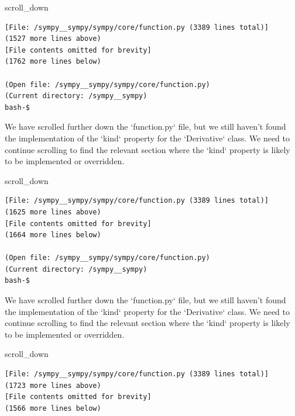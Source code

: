 {\begin{agentbox}
\hrulefill
\begin{CodeVerbatim}[breaklines=true, breakanywhere=true]
scroll_down
\end{CodeVerbatim}
\end{agentbox}
\begin{observationbox}\begin{Verbatim}[breaklines=true, breakanywhere=true]
[File: /sympy__sympy/sympy/core/function.py (3389 lines total)]
(1527 more lines above)
[File contents omitted for brevity]
(1762 more lines below)

(Open file: /sympy__sympy/sympy/core/function.py)
(Current directory: /sympy__sympy)
bash-$
\end{Verbatim}
\end{observationbox}
\begin{agentbox}
We have scrolled further down the `function.py` file, but we still haven't found the implementation of the `kind` property for the `Derivative` class. We need to continue scrolling to find the relevant section where the `kind` property is likely to be implemented or overridden.



\hrulefill
\begin{CodeVerbatim}[breaklines=true, breakanywhere=true]
scroll_down
\end{CodeVerbatim}
\end{agentbox}
\begin{observationbox}\begin{Verbatim}[breaklines=true, breakanywhere=true]
[File: /sympy__sympy/sympy/core/function.py (3389 lines total)]
(1625 more lines above)
[File contents omitted for brevity]
(1664 more lines below)

(Open file: /sympy__sympy/sympy/core/function.py)
(Current directory: /sympy__sympy)
bash-$
\end{Verbatim}
\end{observationbox}
\begin{agentbox}
We have scrolled further down the `function.py` file, but we still haven't found the implementation of the `kind` property for the `Derivative` class. We need to continue scrolling to find the relevant section where the `kind` property is likely to be implemented or overridden.



\hrulefill
\begin{CodeVerbatim}[breaklines=true, breakanywhere=true]
scroll_down
\end{CodeVerbatim}
\end{agentbox}
\begin{observationbox}\begin{Verbatim}[breaklines=true, breakanywhere=true]
[File: /sympy__sympy/sympy/core/function.py (3389 lines total)]
(1723 more lines above)
[File contents omitted for brevity]
(1566 more lines below)


\end{Verbatim}
\end{observationbox}}
